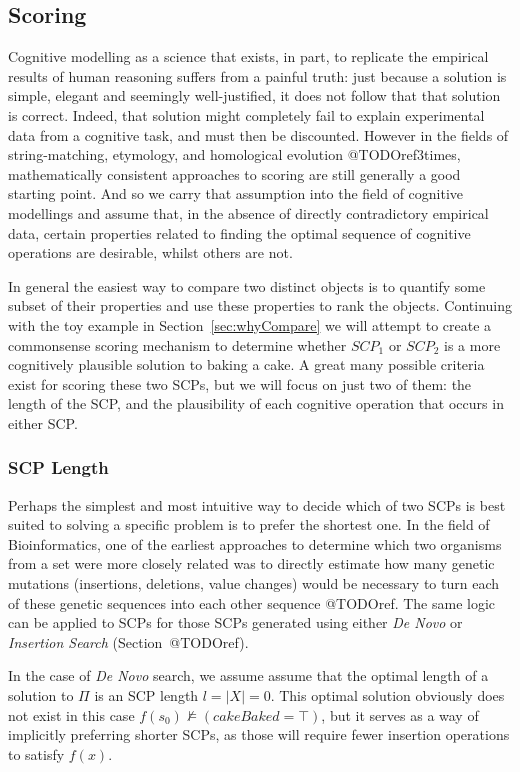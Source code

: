 \documentclass[
11pt, %
english, %
singlespacing, %
headsepline, %
]{MastersDoctoralThesis} %
\begin{document}
\subsection{Scoring}
Cognitive modelling as a science that exists, in part, to replicate the empirical results of human reasoning suffers from a painful truth: just because a solution is simple, elegant and seemingly well-justified, it does not follow that that solution is correct. Indeed, that solution might completely fail to explain experimental data from a cognitive task, and must then be discounted. However in the fields of string-matching, etymology, and homological evolution @TODOref3times, mathematically consistent approaches to scoring are still generally a good starting point. And so we carry that assumption into the field of cognitive modellings and assume that, in the absence of directly contradictory empirical data, certain properties related to finding the optimal sequence of cognitive operations are desirable, whilst others are not.

In general the easiest way to compare two distinct objects is to quantify some subset of their properties and use these properties to rank the objects. Continuing with the toy example in Section~\ref{sec:whyCompare} we will attempt to create a commonsense scoring mechanism to determine whether $SCP_1$ or $SCP_2$ is a more cognitively plausible solution to baking a cake. A great many possible criteria exist for scoring these two SCPs, but we will focus on just two of them: the length of the SCP, and the plausibility of each cognitive operation that occurs in either SCP.

\subsubsection{SCP Length}
Perhaps the simplest and most intuitive way to decide which of two SCPs is best suited to solving a specific problem is to prefer the shortest one. In the field of Bioinformatics, one of the earliest approaches to determine which two organisms from a set were more closely related was to directly estimate how many genetic mutations (insertions, deletions, value changes) would be necessary to turn each of these genetic sequences into each other sequence @TODOref. The same logic can be applied to SCPs for those SCPs generated using either \textit{De Novo} or \textit{Insertion Search} (Section~@TODOref).

In the case of \textit{De Novo} search, we assume assume that the optimal length of a solution to $\Pi$ is an SCP length $l=|X|=0$. This optimal solution obviously does not exist in this case $f(s_0) \not\models (cakeBaked = \top)$, but it serves as a way of implicitly preferring shorter SCPs, as those will require fewer insertion operations to satisfy $f(x)$. 
\end{document}
